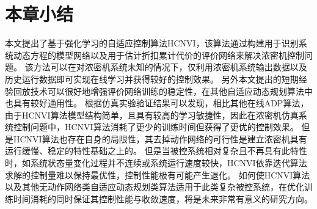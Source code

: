 


\section{本章小结}
本文提出了基于强化学习的自适应控制算法HCNVI，该算法通过构建用于识别系统动态方程的模型网络以及用于估计折扣累计代价的评价网络来解决浓密机控制问题。
该方法可以在对浓密机系统未知的情况下，仅利用浓密机系统输出数据以及历史运行数据即可实现在线学习并获得较好的控制效果。
另外本文提出的短期经验回放技术可以很好地增强评价网络训练的稳定性，在其他自适应动态规划算法中也具有较好通用性。
根据仿真实验验证结果可以发现，相比其他在线ADP算法，由于HCNVI算法模型结构简单，且具有较高的学习敏捷性，因此在浓密机仿真系统控制问题中，HCNVI算法消耗了更少的训练时间但获得了更优的控制效果。
但是HCNVI算法也存在自身的局限性，其去掉动作网络的可行性是建立浓密机具有运行缓慢、稳定的特性基础之上的。
但是当被控系统相对复杂且不再具有此特性时，如系统状态量变化过程并不连续或系统运行速度较快，HCNVI依靠迭代算法求解的控制量难以保持最优性，控制性能极有可能产生退化。
如何使HCNVI算法以及其他无动作网络类自适应动态规划类算法适用于此类复杂被控系统，在优化训练时间消耗的同时保证其控制性能与收敛速度，将是未来非常有意义的研究方向。